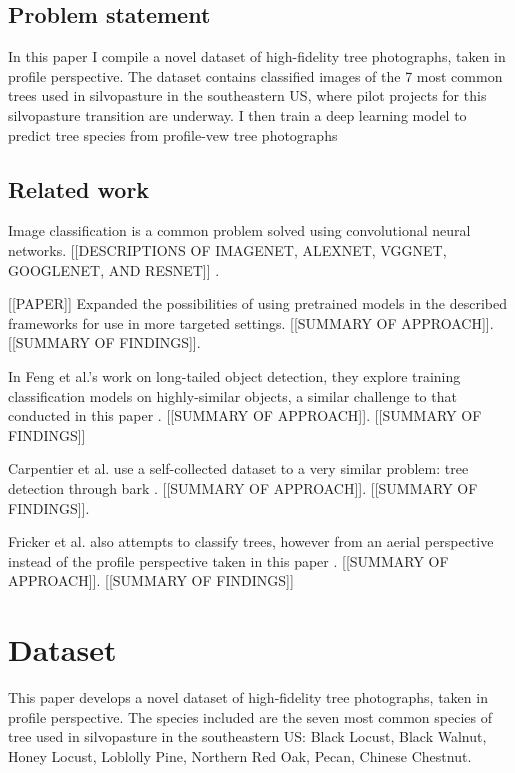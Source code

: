 \documentclass[10pt,twocolumn,letterpaper]{article}
\begin{document}
\subsection{Problem statement}

In this paper I compile a novel dataset of high-fidelity tree photographs, taken in profile perspective. The dataset contains classified images of the 7 most common trees used in silvopasture in the southeastern US, where pilot projects for this silvopasture transition are underway. I then train a deep learning model to predict tree species from profile-vew tree photographs

\subsection{Related work}

Image classification is a common problem solved using convolutional neural networks. [[DESCRIPTIONS OF IMAGENET, ALEXNET, VGGNET, GOOGLENET, AND RESNET]] \cite{VGGNet, GoogLeNET, ResNET}. 

[[PAPER]] Expanded the possibilities of using pretrained models in the described frameworks for use in more targeted settings. [[SUMMARY OF APPROACH]]. [[SUMMARY OF FINDINGS]].

In Feng et al.'s work on long-tailed object detection, they explore training classification models on highly-similar objects, a similar challenge to that conducted in this paper \cite{Feng_2021_ICCV}.  [[SUMMARY OF APPROACH]]. [[SUMMARY OF FINDINGS]]

Carpentier et al. use a self-collected dataset to a very similar problem: tree detection through bark \cite{Carpentier_2018}. [[SUMMARY OF APPROACH]]. [[SUMMARY OF FINDINGS]].

Fricker et al. also attempts to classify trees, however from an aerial perspective instead of the profile perspective taken in this paper \cite{Fricker_RS_2019}. [[SUMMARY OF APPROACH]]. [[SUMMARY OF FINDINGS]]

\section{Dataset}

This paper develops a novel dataset of high-fidelity tree photographs, taken in profile perspective. The species included are the seven most common species of tree used in silvopasture in the southeastern US: Black Locust, Black Walnut, Honey Locust, Loblolly Pine, Northern Red Oak, Pecan, Chinese Chestnut. 
\end{document}

